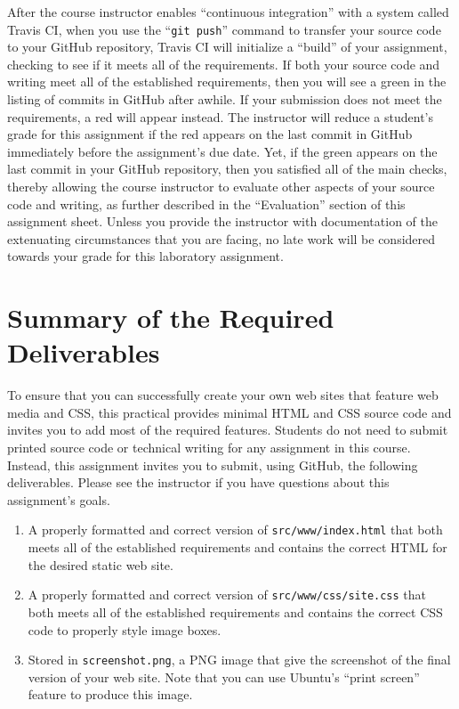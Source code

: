 \documentclass[11pt]{article}
\newcommand{\mainprogramsource}{\lstinline{src/www/index.html}}
\newcommand{\secondprogramsource}{\lstinline{src/www/css/site.css}}
\newcommand{\screenshot}{\lstinline{screenshot.png}}
\newcommand{\gitpush}{\command{git push}}
\newcommand{\command}[1]{``\lstinline{#1}''}
\newcommand{\step}[1]{``{#1}''}
\newcommand{\checkmark}{\ding{51}}
\newcommand{\naughtmark}{\ding{55}}
\begin{document}
After the course instructor enables \step{continuous integration} with a system
called Travis CI, when you use the \gitpush{} command to transfer your source
code to your GitHub repository, Travis CI will initialize a \step{build} of your
assignment, checking to see if it meets all of the requirements. If both your
source code and writing meet all of the established requirements, then you will
see a green \checkmark{} in the listing of commits in GitHub after awhile. If
your submission does not meet the requirements, a red \naughtmark{} will appear
instead. The instructor will reduce a student's grade for this assignment if the
red \naughtmark{} appears on the last commit in GitHub immediately before the
assignment's due date. Yet, if the green \checkmark{} appears on the last commit
in your GitHub repository, then you satisfied all of the main checks, thereby
allowing the course instructor to evaluate other aspects of your source code and
writing, as further described in the \step{Evaluation} section of this
assignment sheet. Unless you provide the instructor with documentation of the
extenuating circumstances that you are facing, no late work will be considered
towards your grade for this laboratory assignment.

\section*{Summary of the Required Deliverables}

\noindent To ensure that you can successfully create your own web sites that
feature web media and CSS, this practical provides minimal HTML and CSS source
code and invites you to add most of the required features. Students do not need
to submit printed source code or technical writing for any assignment in this
course. Instead, this assignment invites you to submit, using GitHub, the
following deliverables. Please see the instructor if you have questions about
this assignment's goals.

\vspace*{-.05in}

\begin{enumerate}

  \setlength{\itemsep}{0in}

\item A properly formatted and correct version of \mainprogramsource{} that both
  meets all of the established requirements and contains the correct HTML for
  the desired static web site.

\item A properly formatted and correct version of \secondprogramsource{} that
  both meets all of the established requirements and contains the correct CSS
  code to properly style image boxes.

\item Stored in \screenshot{}, a PNG image that give the screenshot of the final
  version of your web site. Note that you can use Ubuntu's ``print screen''
  feature to produce this image.

\end{enumerate}
\end{document}
